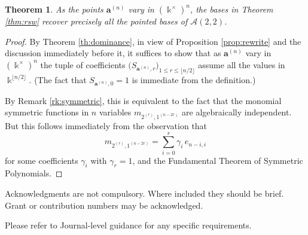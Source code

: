 \documentclass[pdflatex,sn-mathphys]{sn-jnl}%
\theoremstyle{thmstyleone}%
\newtheorem{theorem}{Theorem}[section]%
\theoremstyle{thmstyletwo}%
\theoremstyle{thmstylethree}%
\newcommand{\bfa}{\boldsymbol{a}}
\newcommand{\cA}{\mathcal{A}}
\newcommand{\kk}{\Bbbk}
\begin{document}
  \begin{theorem}
    As the points $\bfa^{(n)}$ vary in $(\kk^\times)^n$, the bases in Theorem \ref{thm:rsw} recover precisely all the pointed bases of $\cA(2,2)$.
  \end{theorem}
  \begin{proof}
    By Theorem \ref{th:dominance}, in view of Proposition \ref{prop:rewrite} and the discussion immediately before it, it suffices to show that as $\bfa^{(n)}$ vary in $(\kk^\times)^n$ the tuple of coefficients $\big(S_{\bfa^{(n)},r}\big)_{1\leq r \leq \lfloor n/2\rfloor}$ assume all the values in $\kk^{\lfloor n/2\rfloor}$.
    (The fact that $S_{\bfa^{(n)},0}=1$ is immediate from the definition.)

    By Remark \ref{rk:symmetric}, this is equivalent to the fact that the monomial symmetric functions in $n$ variables $m_{2^{(r)},1^{(n-2r)}}$ are algebraically independent.
    But this follows immediately from the observation that 
    \[ 
      m_{2^{(r)},1^{(n-2r)}} = \sum_{i=0}^r \gamma_i\, e_{n-i,i}
    \]
    for some coefficients $\gamma_i$ with $\gamma_r=1$, and the Fundamental Theorem of Symmetric Polynomials. 
  \end{proof}


Acknowledgments are not compulsory. Where included they should be brief. Grant or contribution numbers may be acknowledged.

Please refer to Journal-level guidance for any specific requirements.




\end{document}
